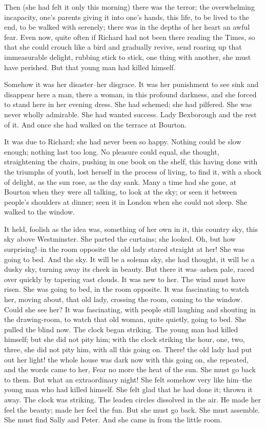 \documentclass[lang=cn,10pt]{elegantbook}
\begin{document}
Then (she had felt it only this morning) there was the terror; the
overwhelming incapacity, one's parents giving it into one's hands,
this life, to be lived to the end, to be walked with serenely;
there was in the depths of her heart an awful fear.  Even now,
quite often if Richard had not been there reading the Times, so
that she could crouch like a bird and gradually revive, send
roaring up that immeasurable delight, rubbing stick to stick, one
thing with another, she must have perished.  But that young man had
killed himself.

Somehow it was her disaster--her disgrace.  It was her punishment
to see sink and disappear here a man, there a woman, in this
profound darkness, and she forced to stand here in her evening
dress.  She had schemed; she had pilfered.  She was never wholly
admirable.  She had wanted success.  Lady Bexborough and the rest
of it.  And once she had walked on the terrace at Bourton.

It was due to Richard; she had never been so happy.  Nothing could
be slow enough; nothing last too long.  No pleasure could equal,
she thought, straightening the chairs, pushing in one book on the
shelf, this having done with the triumphs of youth, lost herself in
the process of living, to find it, with a shock of delight, as the
sun rose, as the day sank.  Many a time had she gone, at Bourton
when they were all talking, to look at the sky; or seen it between
people's shoulders at dinner; seen it in London when she could not
sleep.  She walked to the window.

It held, foolish as the idea was, something of her own in it, this
country sky, this sky above Westminster.  She parted the curtains;
she looked.  Oh, but how surprising!--in the room opposite the old
lady stared straight at her!  She was going to bed.  And the sky.
It will be a solemn sky, she had thought, it will be a dusky sky,
turning away its cheek in beauty.  But there it was--ashen pale,
raced over quickly by tapering vast clouds.  It was new to her.
The wind must have risen.  She was going to bed, in the room
opposite.  It was fascinating to watch her, moving about, that old
lady, crossing the room, coming to the window.  Could she see her?
It was fascinating, with people still laughing and shouting in the
drawing-room, to watch that old woman, quite quietly, going to bed.
She pulled the blind now.  The clock began striking.  The young man
had killed himself; but she did not pity him; with the clock
striking the hour, one, two, three, she did not pity him, with all
this going on.  There! the old lady had put out her light! the
whole house was dark now with this going on, she repeated, and the
words came to her, Fear no more the heat of the sun.  She must go
back to them.  But what an extraordinary night!  She felt somehow
very like him--the young man who had killed himself.  She felt glad
that he had done it; thrown it away.  The clock was striking.  The
leaden circles dissolved in the air.  He made her feel the beauty;
made her feel the fun.  But she must go back.  She must assemble.
She must find Sally and Peter.  And she came in from the little
room.
\end{document}
